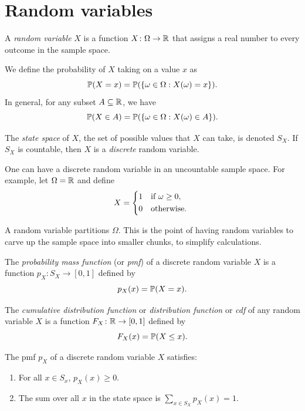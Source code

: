 \section{Random variables}

\begin{definition}
  A \emph{random variable} $X$ is a function $X \colon \Omega \to \mathbb{R}$ that assigns a real number to every outcome in the sample space.

  We define the probability of $X$ taking on a value $x$ as \[
    \operatorname{\mathbb{P}}(X = x) = \operatorname{\mathbb{P}}(\{\omega \in \Omega : X(\omega) = x\}).
  \] In general, for any subset $A \subseteq \mathbb{R}$, we have \[
    \operatorname{\mathbb{P}}(X \in A) = \operatorname{\mathbb{P}}(\{\omega \in \Omega : X(\omega) \in A\}).
  \] 
\end{definition}

\begin{definition}
  The \emph{state space} of $X$, the set of possible values that $X$ can take, is denoted $S_X$. If $S_X$ is countable, then $X$ is a \emph{discrete} random variable.
\end{definition}

\begin{remark}
  One can have a discrete random variable in an uncountable sample space. For example, let $\Omega = \mathbb{R}$ and define \[
    X = 
    \begin{cases*}
      1 & if $\omega \ge 0$, \\
      0 & otherwise.
    \end{cases*}
  \]
\end{remark}

\begin{remark}
  A random variable partitions $\Omega$. This is the point of having random variables \Emdash to carve up the sample space into smaller chunks, to simplify calculations.
\end{remark}

\begin{definition}
  The \emph{probability mass function} (or \emph{pmf}) of a discrete random variable $X$ is a function $p_X \colon S_X \to [0, 1]$ defined by \[
    p_X(x) = \operatorname{\mathbb{P}}(X = x).
  \] 

  The \emph{cumulative distribution function} or \emph{distribution function} or \emph{cdf} of any random variable $X$ is a function $F_X \colon \mathbb{R} \to [0, 1]$ defined by \[
    F_X(x) = \operatorname{\mathbb{P}}(X \le x).
  \] 
\end{definition}

\begin{proposition}
  The pmf $p_X$ of a discrete random variable $X$ satisfies:
  \begin{enumerate}
    \item For all $x \in S_x$, $p_X(x) \ge 0$.
    \item The sum over all $x$ in the state space is $\sum_{x \in S_X} p_X(x) = 1$.
  \end{enumerate}
\end{proposition}

